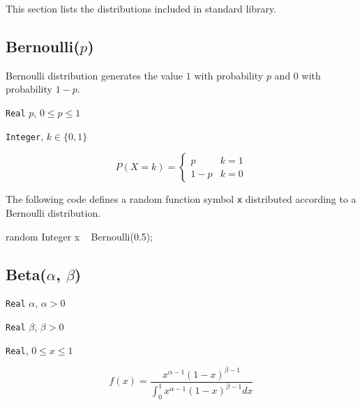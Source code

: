 This section lists the distributions included in \bl standard library.


\subsection{Bernoulli($p$)}
Bernoulli distribution generates the value $1$ with probability $p$ and $0$ with probability $1-p$. 

\begin{itemize*}
\item[] \verb|Real|
 $p$, $0 \leq p \leq 1$ 
\end{itemize*}

\begin{itemize*}
\item[] \verb|Integer|, $k \in \{0, 1\}$ 
\end{itemize*}

\[
	P(X = k) = \left\{
	  \begin{array}{lr}
	    p &    k = 1 \\
	    1-p &  k = 0
	  \end{array}
	\right.
\]

The following code defines a random function symbol \verb|x| distributed according to a Bernoulli distribution.
\begin{blogcode}
random Integer x ~ Bernoulli(0.5);
\end{blogcode}

\subsection{Beta($\alpha$, $\beta$)}

\begin{itemize*}
\item[] \verb|Real| $\alpha$, $\alpha > 0$ 
\item[] \verb|Real| $\beta$, $\beta > 0$ 
\end{itemize*}

\begin{itemize*}
\item[]
\verb|Real|, $0 \leq x \leq 1$ 
\end{itemize*}

\[
	f(x) = \frac{x^{\alpha - 1} (1-x)^{\beta - 1}}{\int_{0}^{1} x^{\alpha - 1} (1-x)^{\beta - 1} dx}
\]

